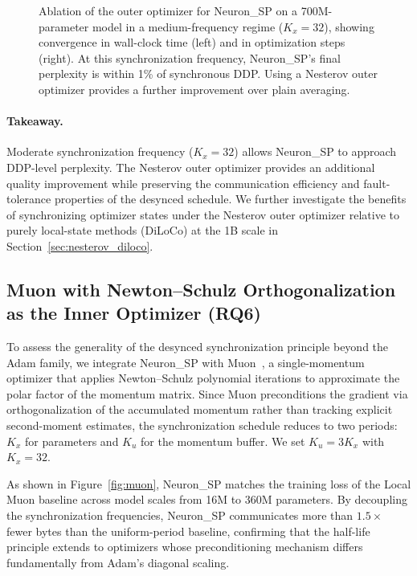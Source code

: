 \documentclass{article}
\begin{document}
\begin{figure}[t]
\centering
\caption{Ablation of the outer optimizer for Neuron\_SP on a
700M-parameter model in a medium-frequency regime ($K_x = 32$), showing
convergence in wall-clock time (left) and in optimization steps (right).
At this synchronization frequency, Neuron\_SP's final perplexity is
within 1\% of synchronous DDP. Using a Nesterov outer optimizer provides
a further improvement over plain averaging.}
\label{fig:nesterov}
\end{figure}

\paragraph{Takeaway.}
Moderate synchronization frequency ($K_x = 32$) allows Neuron\_SP to
approach DDP-level perplexity. The Nesterov outer optimizer provides
an additional quality improvement while preserving the communication
efficiency and fault-tolerance properties of the desynced schedule.
We further investigate the benefits of synchronizing optimizer states
under the Nesterov outer optimizer relative to purely local-state methods
(DiLoCo) at the 1B scale in Section~\ref{sec:nesterov_diloco}.

\subsection{Muon with Newton--Schulz Orthogonalization as the Inner
Optimizer (RQ6)}
\label{sec:rq6}

To assess the generality of the desynced synchronization principle beyond
the Adam family, we integrate Neuron\_SP with
Muon~\citep{jordan2024muon}, a single-momentum optimizer that applies
Newton--Schulz polynomial iterations to approximate the polar factor of
the momentum matrix. Since Muon preconditions the gradient via
orthogonalization of the accumulated momentum rather than tracking
explicit second-moment estimates, the synchronization schedule reduces
to two periods: $K_x$ for parameters and $K_u$ for the momentum buffer.
We set $K_u = 3K_x$ with $K_x = 32$.

As shown in Figure~\ref{fig:muon}, Neuron\_SP matches the training
loss of the Local Muon baseline across model scales from 16M to 360M
parameters. By decoupling the synchronization frequencies, Neuron\_SP
communicates more than $1.5\times$ fewer bytes than the uniform-period
baseline, confirming that the half-life principle extends to optimizers
whose preconditioning mechanism differs fundamentally from Adam's
diagonal scaling.
\end{document}
